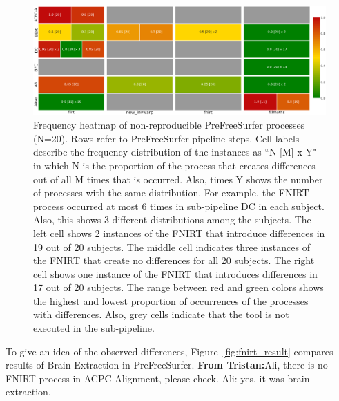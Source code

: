 \documentclass[a4paper,num-refs]{oup-contemporary}
\newcommand{\tristan}[1]{\color{blue}\textbf{From Tristan:}#1\color{black}}
\begin{document}


\begin{figure}
\centering
  \includegraphics[width=\textwidth]{images/pfs_heatmap.png}
  \caption{Frequency heatmap of non-reproducible PreFreeSurfer processes (N=20). 
           Rows refer to PreFreeSurfer pipeline steps.
           Cell labels describe the frequency distribution of the instances as ``N [M] x Y" 
           in which N is the proportion of the process 
           that creates differences out of all M times that is occurred. 
           Also, times Y shows the number of processes with the same distribution.
           For example, the FNIRT process occurred at most 6 times in sub-pipeline DC in each subject. 
           Also, this shows 3 different distributions among the subjects.
           The left cell shows 2 instances of the FNIRT that introduce differences in 19 out of 20 subjects.
           The middle cell indicates three instances of the FNIRT that create no differences for all 20 subjects.
           The right cell shows one instance of the FNIRT that introduces differences in 17 out of 20 subjects.
           The range between red and green colors shows the highest and lowest 
           proportion of occurrences of the processes with differences.
           Also, grey cells indicate that the tool is not executed in the sub-pipeline.}
  \label{fig:pfs_freq}
\end{figure}


To give an idea of the observed differences, Figure~\ref{fig:fnirt_result} 
compares results of Brain Extraction in PreFreeSurfer. \tristan{Ali, there is no
FNIRT process in ACPC-Alignment, please check. Ali: yes, it was brain extraction.}
\end{document}
